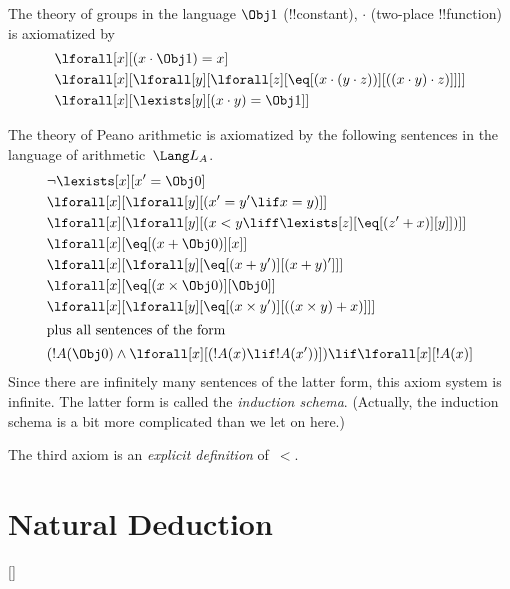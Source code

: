 \begin{ex}
The theory of groups in the language $\Obj 1$ (!!{constant}), $\cdot$
(two-place !!{function}) is axiomatized by
\begin{align*}
& \lforall[x][(x \cdot \Obj 1) = x]\\
& \lforall[x][\lforall[y][\lforall[z][\eq[(x \cdot (y \cdot z))][((x
          \cdot y) \cdot z)]]]]\\
& \lforall[x][\lexists[y][(x \cdot y) = \Obj 1]]
\end{align*}
\end{ex}

\begin{ex}
The theory of Peano arithmetic is axiomatized by the following
sentences in the language of arithmetic~$\Lang L_A$.
\begin{align*}
& \lnot\lexists[x][x' = \Obj 0]\\
& \lforall[x][\lforall[y][(x' = y' \lif x = y)]]\\
& \lforall[x][\lforall[y][(x < y \liff \lexists[z][\eq[(z' + x)][y]])]]\\
& \lforall[x][\eq[(x + \Obj 0)][x]]\\
& \lforall[x][\lforall[y][\eq[(x + y')][(x + y)']]]\\
& \lforall[x][\eq[(x \times \Obj 0)][\Obj 0]]\\
& \lforall[x][\lforall[y][\eq[(x \times y')][((x \times y) + x)]]]\\
\intertext{plus all sentences of the form}
& (!A(\Obj 0) \land \lforall[x][(!A(x) \lif !A(x'))]) \lif \lforall[x][!A(x)]
\end{align*}
Since there are infinitely many sentences of the latter form, this
axiom system is infinite.  The latter form is called the
\emph{induction schema}. (Actually, the induction schema is a bit more
complicated than we let on here.)

The third axiom is an \emph{explicit definition} of~$<$.
\end{ex}

\OLEndChapterHook

\chapter{Natural Deduction}

[\nosection]


